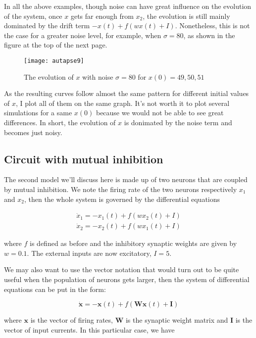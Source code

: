 In all the above examples, though noise can have great influence on the 
evolution of the system, once $x$ gets far enough from $x_2$, the evolution
is still mainly dominated by the drift term $-x(t) + f(wx(t)+I)$.
Nonetheless, this is not the case for a greater noise level, for example,
when $\sigma = 80$, as shown in the figure at the top of the next page.

\vspace{-1em}
\begin{figure}[H]
  \centering
  \texttt{[image: autapse9]}
  \caption
    {The evolution of $x$ with noise $\sigma = 80$ for $x(0) = 49, 50, 51$}
\end{figure}

As the resulting curves follow almost the same pattern for different 
initial values of $x$, I plot all of them on the same graph. It's not worth
it to plot several simulations for a same $x(0)$ because we would not be able
to see great differences. In short, the evolution of $x$ is donimated by
the noise term and becomes just noisy.

\subsection{Circuit with mutual inhibition}

The second model we'll discuss here is made up of two neurons that are coupled
by mutual inhibition. We note the firing rate of the two neurons respectively
$x_1$ and $x_2$, then the whole system is governed by the differential
equations

\begin{gather*}
  \dot{x}_1 = -x_1(t) + f(wx_2(t) + I)\\
  \dot{x}_2 = -x_2(t) + f(wx_1(t) + I)
\end{gather*}

\noindent
where $f$ is defined as before and the inhibitory synaptic weights are given
by $w = 0.1$. The external inputs are now excitatory, $I = 5$.

We may also want to use the vector notation that would turn out to be quite
useful when the population of neurons gets larger, then the system of
differential equations can be put in the form:

\[\dot{\mathbf{x}} = -\mathbf{x}(t) + f(\mathbf{Wx}(t) + \mathbf{I})\]

\noindent
where $\mathbf{x}$ is the vector of firing rates, $\mathbf{W}$ is the synaptic 
weight matrix and $\mathbf{I}$ is the vector of input currents. In this
particular case, we have

